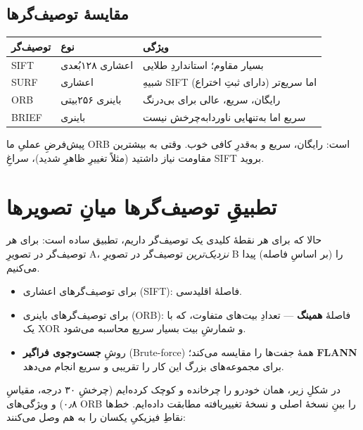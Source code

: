 \documentclass[12pt]{article}
\begin{document}
\subsection{مقایسهٔ توصیف‌گرها}

\begin{center}
\begin{tabular}{@{}lll@{}}
\hline
\textbf{توصیف‌گر} & \textbf{نوع} & \textbf{ویژگی} \\
\hline
SIFT & اعشاری ۱۲۸‌بُعدی & بسیار مقاوم؛ استانداردِ طلایی \\
SURF & اعشاری & شبیهِ SIFT اما سریع‌تر (دارای ثبتِ اختراع) \\
ORB & باینری ۲۵۶‌بیتی & رایگان، سریع، عالی برای بی‌درنگ \\
BRIEF & باینری & سریع اما به‌تنهایی ناوردا‌به‌چرخش نیست \\
\hline
\end{tabular}
\end{center}

\begin{nokte}
پیش‌فرضِ عملیِ ما ORB است: رایگان، سریع و به‌قدرِ کافی خوب. وقتی به بیشترین مقاومت نیاز داشتید (مثلاً تغییرِ ظاهرِ شدید)، سراغِ SIFT بروید.
\end{nokte}

\section{تطبیقِ توصیف‌گرها میانِ تصویرها}

حالا که برای هر نقطهٔ کلیدی یک توصیف‌گر داریم، تطبیق ساده است: برای هر توصیف‌گر در تصویرِ A، \emph{نزدیک‌ترین} توصیف‌گر در تصویرِ B را (بر اساسِ فاصله) پیدا می‌کنیم.

\begin{itemize}
  \item برای توصیف‌گرهای اعشاری (SIFT): فاصلهٔ اقلیدسی.
  \item برای توصیف‌گرهای باینری (ORB): فاصلهٔ \textbf{همینگ} — تعدادِ بیت‌های متفاوت، که با یک XOR و شمارشِ بیت بسیار سریع محاسبه می‌شود.
  \item روشِ \textbf{جست‌وجوی فراگیر} (Brute-force) همهٔ جفت‌ها را مقایسه می‌کند؛ \textbf{FLANN} برای مجموعه‌های بزرگ این کار را تقریبی و سریع انجام می‌دهد.
\end{itemize}

در شکلِ زیر، همان خودرو را چرخانده و کوچک کرده‌ایم (چرخشِ ۳۰ درجه، مقیاسِ ۰٫۸) و ویژگی‌های ORB را بینِ نسخهٔ اصلی و نسخهٔ تغییریافته مطابقت داده‌ایم. خط‌ها نقاطِ فیزیکیِ یکسان را به هم وصل می‌کنند:
\end{document}
